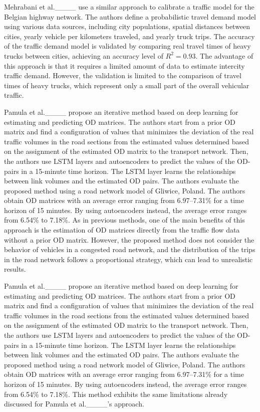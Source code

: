 Mehrabani et al.____ use a similar approach to calibrate a traffic model for the Belgian highway network. The authors define a probabilistic travel demand model using various data sources, including city populations, spatial distances between cities, yearly vehicle per kilometers traveled, and yearly truck trips. The accuracy of the traffic demand model is validated by comparing real travel times of heavy trucks between cities, achieving an accuracy level of $R^2 = 0.93$. The advantage of this approach is that it requires a limited amount of data to estimate intercity traffic demand. However, the validation is limited to the comparison of travel times of heavy trucks, which represent only a small part of the overall vehicular traffic.

Pamula et al.____ propose an iterative method based on deep learning for estimating and predicting OD matrices. The authors start from a prior OD matrix and find a configuration of values that minimizes the deviation of the real traffic volumes in the road sections from the estimated values determined based on the assignment of the estimated OD matrix to the transport network. Then, the authors use LSTM layers and autoencoders to predict the values of the OD-pairs in a 15-minute time horizon. The LSTM layer learns the relationships between link volumes and the estimated OD pairs. The authors evaluate the proposed method using a road network model of Gliwice, Poland. The authors obtain OD matrices with an average error ranging from 6.97–7.31\% for a time horizon of 15 minutes. By using autoencoders instead, the average error ranges from 6.54\% to 7.18\%. As in previous methods, one of the main benefits of this approach is the estimation of OD matrices directly from the traffic flow data without a prior OD matrix. However, the proposed method does not consider the behavior of vehicles in a congested road network, and the distribution of the trips in the road network follows a proportional strategy, which can lead to unrealistic results.

Pamula et al.____ propose an iterative method based on deep learning for estimating and predicting OD matrices. The authors start from a prior OD matrix and find a configuration of values that minimizes the deviation of the real traffic volumes in the road sections from the estimated values determined based on the assignment of the estimated OD matrix to the transport network. Then, the authors use LSTM layers and autoencoders to predict the values of the OD-pairs in a 15-minute time horizon. The LSTM layer learns the relationships between link volumes and the estimated OD pairs. The authors evaluate the proposed method using a road network model of Gliwice, Poland. The authors obtain OD matrices with an average error ranging from 6.97–7.31\% for a time horizon of 15 minutes. By using autoencoders instead, the average error ranges from 6.54\% to 7.18\%. This method exhibits the same limitations already discussed for Pamula et al.____'s approach.

